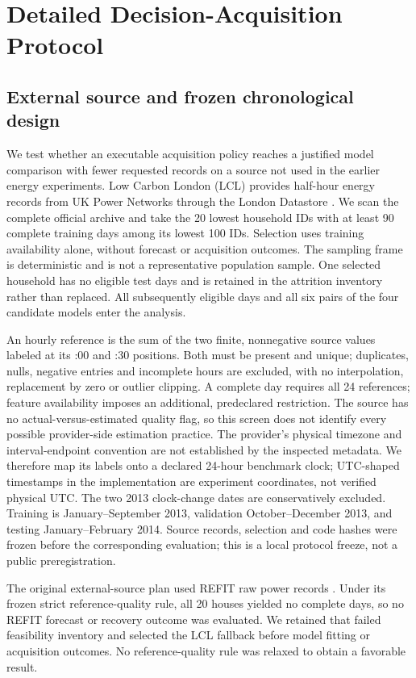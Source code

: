 \documentclass[12pt]{article}
\begin{document}
\FloatBarrier
\section{Detailed Decision-Acquisition Protocol}\label{app:detailed-decision-protocol}
\label{sec:external-evaluation}
\subsection{External source and frozen chronological design}\label{sec:external-design}
We test whether an executable acquisition policy reaches a justified model
comparison with fewer requested records on a source not used in the earlier
energy experiments. Low Carbon London (LCL) provides half-hour energy records
from UK Power Networks through the London Datastore \cite{lcl}. We scan the
complete official archive and take the 20 lowest household IDs with at least
90 complete training days among its lowest 100 IDs. Selection uses training
availability alone, without forecast or acquisition outcomes. The sampling
frame is deterministic and is not a representative population sample.
One selected household has no eligible test days and is retained in the
attrition inventory rather than replaced. All subsequently eligible days
and all six pairs of the four candidate models enter the analysis.

An hourly reference is the sum of the two finite, nonnegative source values
labeled at its :00 and :30 positions. Both must be present and unique;
duplicates, nulls, negative entries and incomplete hours are excluded, with
no interpolation, replacement by zero or outlier clipping. A complete day
requires all 24 references; feature availability imposes an additional,
predeclared restriction. The source has no actual-versus-estimated quality
flag, so this screen does not identify every possible provider-side
estimation practice. The provider's physical timezone and interval-endpoint
convention are not established by the inspected metadata. We therefore map
its labels onto a declared 24-hour benchmark clock; UTC-shaped timestamps in
the implementation are experiment coordinates, not verified physical UTC.
The two 2013 clock-change dates are conservatively excluded. Training is
January--September 2013, validation October--December 2013, and testing
January--February 2014. Source records, selection and code hashes were
frozen before the corresponding evaluation; this is a local protocol freeze,
not a public preregistration.

The original external-source plan used REFIT raw power records \cite{refitraw}. Under its
frozen strict reference-quality rule, all 20 houses yielded no complete
days, so no REFIT forecast or recovery outcome was evaluated. We retained
that failed feasibility inventory and selected the LCL fallback before
model fitting or acquisition outcomes. No reference-quality rule was relaxed
to obtain a favorable result.
\end{document}
